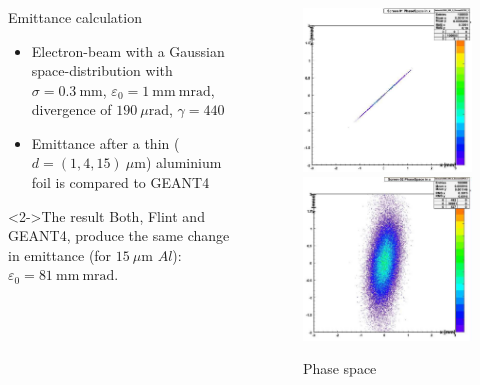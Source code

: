 \documentclass{beamer}
\newcommand{\ident}{\thesection.\thesubsection}
\newcommand{\ftitle}{\frametitle{\nameref{\ident}}}
\newcommand{\geant}{G{\smaller EANT}4 }
\newcommand{\geantws}{G{\smaller EANT}4}
\begin{document}
\begin{frame}
	\ftitle
	\begin{columns}
		\begin{column}{7.5cm}
			\begin{block}{Emittance calculation}
				\begin{itemize}
					\item Electron-beam with a Gaussian space-distribution with $\sigma = 0.3 ~\text{mm}$, $\varepsilon_0 = 1~ \text{mm}~\text{mrad}$, divergence of $190~\mu \text{rad}$, $\gamma = 440$
					\item Emittance after a thin ($d = (1, 4, 15) ~\mu\text{m}$) aluminium foil is compared to \geant
				\end{itemize}
			\end{block}
			\begin{exampleblock}<2->{The result}
				Both, Flint and \geantws, produce the same change in emittance (for $15~\mu\text{m}$ $Al$): $\varepsilon_0 = 81~\text{mm}~\text{mrad}$.
			\end{exampleblock}
		\end{column}
		\begin{column}{4cm}
			\begin{figure}
				\includegraphics[width=0.67\columnwidth]{img/emittance_ps_pre}\\\vskip 10pt
				\includegraphics[width=0.67\columnwidth]{img/emittance_ps_post}
				\caption{Phase space}
			\end{figure}
		\end{column}
	\end{columns}
\end{frame}
\end{document}
